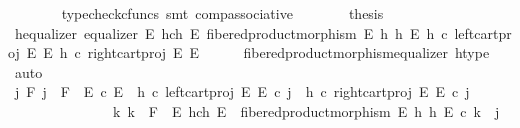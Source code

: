 \begin{isabellebody}
\ \ \ \ \ \ \isamarkupfalse%
\ {\isacharparenleft}{\kern0pt}typecheck{\isacharunderscore}{\kern0pt}cfuncs{\isacharcomma}{\kern0pt}\ smt\ comp{\isacharunderscore}{\kern0pt}associative{}{\isacharparenright}{\kern0pt}\isanewline
\ \ \ \ \isamarkupfalse%
\ \isamarkupfalse%
\ {\isacharquery}{\kern0pt}thesis\isacommand{{\isachardot}{\kern0pt}}\isamarkupfalse%
\isanewline
\ \ \isamarkupfalse%
\isanewline
\ \ \isamarkupfalse%
\ h{\isacharunderscore}{\kern0pt}equalizer{\isacharcolon}{\kern0pt}\ {\isachardoublequoteopen}equalizer\ {\isacharparenleft}{\kern0pt}E\ \isactrlbsub h\isactrlesub {\isasymtimes}\isactrlsub c\isactrlbsub h\isactrlesub \ E{\isacharparenright}{\kern0pt}\ {\isacharparenleft}{\kern0pt}fibered{\isacharunderscore}{\kern0pt}product{\isacharunderscore}{\kern0pt}morphism\ E\ h\ h\ E{\isacharparenright}{\kern0pt}\ {\isacharparenleft}{\kern0pt}h\ {\isasymcirc}\isactrlsub c\ left{\isacharunderscore}{\kern0pt}cart{\isacharunderscore}{\kern0pt}proj\ E\ E{\isacharparenright}{\kern0pt}\ {\isacharparenleft}{\kern0pt}h\ {\isasymcirc}\isactrlsub c\ right{\isacharunderscore}{\kern0pt}cart{\isacharunderscore}{\kern0pt}proj\ E\ E{\isacharparenright}{\kern0pt}{\isachardoublequoteclose}\isanewline
\ \ \ \ \isamarkupfalse%
\ fibered{\isacharunderscore}{\kern0pt}product{\isacharunderscore}{\kern0pt}morphism{\isacharunderscore}{\kern0pt}equalizer\ h{\isacharunderscore}{\kern0pt}type\ \isamarkupfalse%
\ auto\isanewline
\ \ \isamarkupfalse%
\ \isamarkupfalse%
\ {\isachardoublequoteopen}{\isasymforall}j\ F{\isachardot}{\kern0pt}\ j\ {\isacharcolon}{\kern0pt}\ F\ {\isasymrightarrow}\ E\ {\isasymtimes}\isactrlsub c\ E\ {\isasymand}\ {\isacharparenleft}{\kern0pt}h\ {\isasymcirc}\isactrlsub c\ left{\isacharunderscore}{\kern0pt}cart{\isacharunderscore}{\kern0pt}proj\ E\ E{\isacharparenright}{\kern0pt}\ {\isasymcirc}\isactrlsub c\ j\ {\isacharequal}{\kern0pt}\ {\isacharparenleft}{\kern0pt}h\ {\isasymcirc}\isactrlsub c\ right{\isacharunderscore}{\kern0pt}cart{\isacharunderscore}{\kern0pt}proj\ E\ E{\isacharparenright}{\kern0pt}\ {\isasymcirc}\isactrlsub c\ j\ {\isasymlongrightarrow}\isanewline
\ \ \ \ \ \ \ \ \ \ \ \ \ \ \ {\isacharparenleft}{\kern0pt}{\isasymexists}{\isacharbang}{\kern0pt}k{\isachardot}{\kern0pt}\ k\ {\isacharcolon}{\kern0pt}\ F\ {\isasymrightarrow}\ E\ \isactrlbsub h\isactrlesub {\isasymtimes}\isactrlsub c\isactrlbsub h\isactrlesub \ E\ {\isasymand}\ fibered{\isacharunderscore}{\kern0pt}product{\isacharunderscore}{\kern0pt}morphism\ E\ h\ h\ E\ {\isasymcirc}\isactrlsub c\ k\ {\isacharequal}{\kern0pt}\ j{\isacharparenright}{\kern0pt}{\isachardoublequoteclose}\isanewline

\end{isabellebody}
